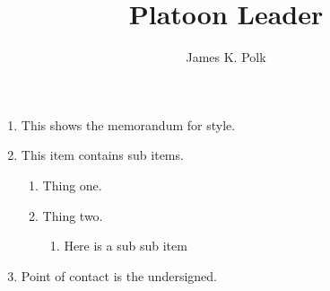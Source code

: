 \documentclass{./latex/armymemo-notikz}
\author{James K. Polk}\rank{1LT}\branch{EN}
\title{Platoon Leader}
\begin{document}
\begin{enumerate}
\item This shows the memorandum for style.
\item This item contains sub items.
\begin{enumerate}
\item Thing one.
\item Thing two.
\begin{enumerate}
\item Here is a sub sub item
\end{enumerate}
\end{enumerate}
\item Point of contact is the undersigned.
\end{enumerate}
\end{document}
